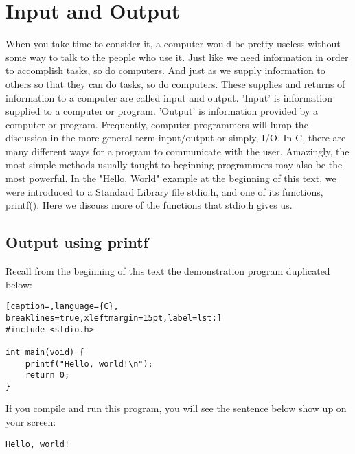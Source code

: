 \section{Input and Output}
When you take time to consider it, a computer would be pretty useless without
some way to talk to the people who use it. Just like we need information in
order to accomplish tasks, so do computers. And just as we supply information
to others so that they can do tasks, so do computers.  These supplies and
returns of information to a computer are called input and output. 'Input' is
information supplied to a computer or program. 'Output' is information provided
by a computer or program. Frequently, computer programmers will lump the
discussion in the more general term input/output or simply, I/O.  In C, there
are many different ways for a program to communicate with the user. Amazingly,
the most simple methods usually taught to beginning programmers may also be the
most powerful. In the "Hello, World" example at the beginning of this text, we
were introduced to a Standard Library file stdio.h, and one of its functions,
printf(). Here we discuss more of the functions that stdio.h gives us.

\subsection{Output using printf}
Recall from the beginning of this text the demonstration program duplicated below:
\lstset{basicstyle=\scriptsize, numbers=left, captionpos=b, tabsize=4}
\begin{lstlisting}[caption=,language={C},
breaklines=true,xleftmargin=15pt,label=lst:]
#include <stdio.h>

int main(void) {
	printf("Hello, world!\n");
	return 0;
}
\end{lstlisting}

If you compile and run this program, you will see the sentence below show up on
your screen:

\scriptsize
\begin{verbatim}
Hello, world!
\end{verbatim}
\normalsize

